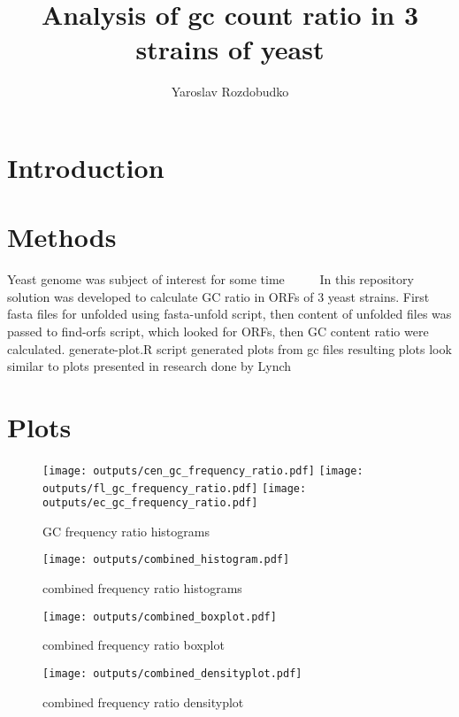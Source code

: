 \documentclass{article}
\title{Analysis of gc count ratio in 3 strains of yeast}
\author{Yaroslav Rozdobudko}
\begin{document}
\maketitle

\section{Introduction}



\section{Methods}
Yeast genome was subject of interest for some time ~\cite{DUJON1996263} ~\cite{Dujon2004} ~\cite{Dujon2017}
In this repository solution was developed to calculate GC ratio in ORFs of 3 yeast strains.
First fasta files for unfolded using fasta-unfold script, then content of unfolded files was passed to find-orfs script,
which looked for ORFs, then GC content ratio were calculated.
generate-plot.R script generated plots from gc files
resulting plots look similar to plots presented in research done by Lynch ~\cite{Lynch2010} 

\section{Plots}

\begin{figure}
    \texttt{[image: outputs/cen\_gc\_frequency\_ratio.pdf]}
    \texttt{[image: outputs/fl\_gc\_frequency\_ratio.pdf]}
    \texttt{[image: outputs/ec\_gc\_frequency\_ratio.pdf]}
    \caption{GC frequency ratio histograms}
\end{figure}

\begin{figure}
    \texttt{[image: outputs/combined\_histogram.pdf]}
    \caption{combined frequency ratio histograms}
\end{figure}

\begin{figure}
    \texttt{[image: outputs/combined\_boxplot.pdf]}
    \caption{combined frequency ratio boxplot}
\end{figure}

\begin{figure}
    \texttt{[image: outputs/combined\_densityplot.pdf]}
    \caption{combined frequency ratio densityplot}
\end{figure}

\clearpage


\end{document}
